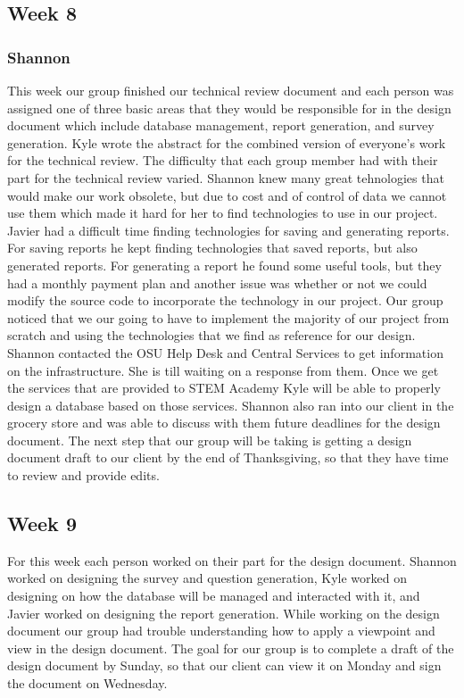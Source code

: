 \documentclass[letterpaper,10pt,serif, draftclsnofoot,onecolumn, compsoc, titlepage]{IEEEtran}
\begin{document}
\subsection{Week 8} 
\subsubsection{Shannon}
This week our group finished our technical review document and each person was assigned one of three basic areas that they would be responsible for in the design document which include database management, report generation, and survey generation. Kyle wrote the abstract for the combined version of everyone's work for the technical review. The difficulty that each group member had with their part for the technical review varied. Shannon knew many great tehnologies that would make our work obsolete, but due to cost and of control of data we cannot use them which made it hard for her to find technologies to use in our project. Javier had a difficult time finding technologies for saving and generating reports. For saving reports he kept finding technologies that saved reports, but also generated reports. For generating a report he found some useful tools, but they had a monthly payment plan and another issue was whether or not we could modify the source code to incorporate the technology in our project. Our group noticed that we our going to have to implement the majority of our project from scratch and using the technologies that we find as reference for our design. Shannon contacted the OSU Help Desk and Central Services to get information on the infrastructure. She is till waiting on a response from them. Once we get the services that are provided to STEM Academy Kyle will be able to properly design a database based on those services. Shannon also ran into our client in the grocery store and was able to discuss with them future deadlines for the design document.  The next step that our group will be taking is getting a design document draft to our client by the end of Thanksgiving, so that they have time to review and provide edits. 

\subsection{Week 9}
For this week each person worked on their part for the design document. Shannon worked on designing the survey and question generation, Kyle worked on designing on how the database will be managed and interacted with it, and Javier worked on designing the report generation. While working on the design document our group had trouble understanding how to apply a viewpoint and view in the design document. The goal for our group is to complete a draft of the design document by Sunday, so that our client can view it on Monday and sign the document on Wednesday. 
\end{document}
